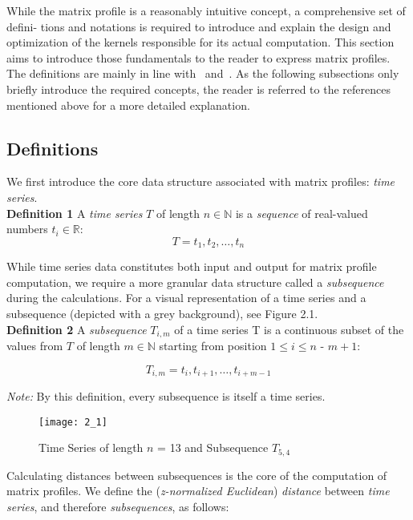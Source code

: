 While the matrix profile is a reasonably intuitive concept, a comprehensive set of defini-
tions and notations is required to introduce and explain the design and optimization of
the kernels responsible for its actual computation. This section aims to introduce those
fundamentals to the reader to express matrix profiles. The definitions are mainly in line
with~\cite{1} and~\cite{2}. As the following subsections only briefly introduce the required
concepts, the reader is referred to the references mentioned above for a more detailed
explanation.

\subsection{Definitions}

We first introduce the core data structure associated with matrix profiles: \textit{time series}.\\

\textbf{Definition 1} A \textit{time series} \(T\) of length \( \textit{n} \in \mathbb{N} \) is a \textit{sequence} of real-valued numbers \( \textit{t}_{i} \in \mathbb{R}\):
\[ T = \textit{t}_{1},\textit{t}_{2},\dots,\textit{t}_{n} \]

While time series data constitutes both input and output for matrix profile computation,
we require a more granular data structure called a \textit{subsequence} during the calculations.
For a visual representation of a time series and a subsequence (depicted with a grey
background), see Figure 2.1.\\

\textbf{Definition 2} A \textit{subsequence} \(T_{i,m}\) of a time series T is a continuous subset of the values from \(T\) of length \( \textit{m} \in \mathbb{N} \) starting from position \( 1 \le \textit{i} \le \textit{n - m} + 1 \):

\[ T_{i,m} = \textit{t}_{i},\textit{t}_{i+1},\dots,\textit{t}_{i + m - 1} \]

\textit{Note:} By this definition, every subsequence is itself a time series.

\begin{figure}[h!]
\texttt{[image: 2\_1]}
\centering
\caption{Time Series of length \( \textit{n} \) = 13 and Subsequence \( T_{5,4} \) }
\end{figure}

Calculating distances between subsequences is the core of the computation of matrix
profiles. We define the (\textit{z-normalized Euclidean}) \textit{distance} between \textit{time series}, and therefore
\textit{subsequences}, as follows:\\

